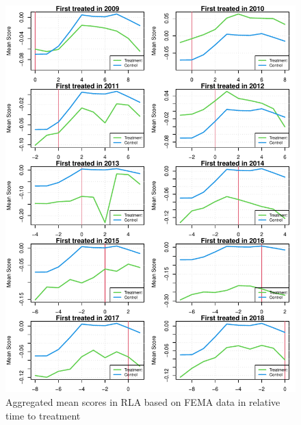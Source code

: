 \begin{figure}[!h]
	\centering
	\includegraphics[scale=1]{"../Code & Data/ParTrendsPlotRLAFEMA.pdf"}
	\caption{Aggregated mean scores in RLA based on FEMA data in relative time to treatment}
	\label{PreTrendsRLA}
\end{figure}


